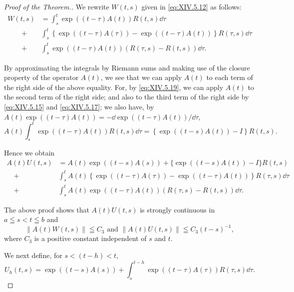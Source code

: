 \begin{proof}[Proof of the Theorem.]
We rewrite $W(t, s)$ given in \eqref{eq:XIV.5.12} as follows:
\[
\begin{aligned}
W (t, s)& = \int_{s} ^{t} \exp ((t - \tau) A (t)) R (t, s) \dd \tau
\\
\qquad +& \int_{s} ^{t} \left\{\exp ((t - \tau) A (\tau)) - \exp ((t - \tau) A (t)) \right\} R (\tau , s) \dd \tau
\\
\qquad +& \int_{s} ^{t} \exp ((t - \tau) A (t)) (R (\tau , s) - R (t, s)) \dd \tau .
\end{aligned}
\]

By approximating the integrals by Riemann sums and making use of the closure property of the operator $A(t)$, we see that we can apply $A(t)$ to each term of the right side of the above equality. For, by \eqref{eq:XIV.5.19}, we can apply $A(t)$ to the second term of the right side; and also to the third term of the right side by \eqref{eq:XIV.5.15} and \eqref{eq:XIV.5.17}; we also have, by $A(t) \exp((t - \tau)A(t)) = -\dd\exp((t - \tau)A(t))/\dd\tau$, 
\[
A (t) \int_{s} ^{t} \exp ((t - \tau) A (t)) R (t, s) \dd \tau = \left\{\exp ((t - s) A (t)) - I \right\} R (t, s).
\]

Hence we obtain 
\begin{equation}\label{eq:XIV.5.21}
\begin{aligned}
A (t) U (t, s)& = A (t) \exp ((t - s) A (s)) + \{\exp ((t - s) A (t)) - I \} R (t, s)
\\
\quad +& \int_{s} ^{t} A (t) \left\{\exp ((t - \tau) A (\tau)) - \exp ((t - \tau) A (t)) \right\} R (\tau , s) \dd \tau
\\
\quad +& \int_{s} ^{t} A (t) \exp ((t - \tau) A (t)) (R (\tau , s) - R (t, s)) \dd \tau .
\end{aligned}
\end{equation}

The above proof shows that $A(t)U(t,s)$ is strongly continuous in $a \leqq s < t \leqq b$ and 
\begin{equation}\label{eq:XIV.5.22}
\left\| A (t) W (t, s) \right\| \leqq C _{3} \text{ and } \left\| A (t) U (t, s) \right\| \leqq C _{3} (t - s) ^{-1},
\end{equation}
where $C_{3}$ is a positive constant independent of $s$ and $t$. 

We next define, for $s < (t - h) < t$, 
\begin{equation}\label{eq:XIV.5.23}
U _{h} (t, s) = \exp ((t - s) A (s)) + \int_{s} ^{t-h} \exp ((t - \tau) A (\tau)) R (\tau , s) \dd \tau .
\end{equation}


\end{proof}
